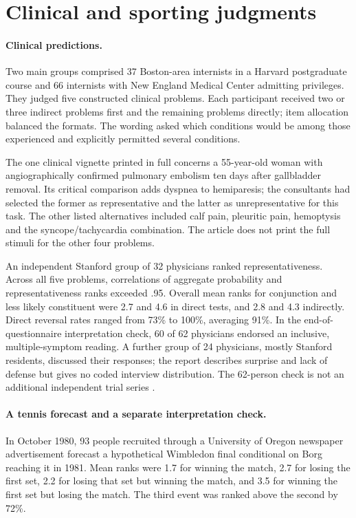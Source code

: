 \section{Clinical and sporting judgments}
\label{sec:p19-conjunction-expert-sport}

\paragraph{Clinical predictions.}
Two main groups comprised 37 Boston-area internists in a Harvard
postgraduate course and 66 internists with New England Medical Center
admitting privileges. They judged five constructed clinical problems.
Each participant received two or three indirect problems first and
the remaining problems directly; item allocation balanced the formats.
The wording asked which conditions would be among those experienced
and explicitly permitted several conditions.

The one clinical vignette printed in full concerns a 55-year-old woman
with angiographically confirmed pulmonary embolism ten days after
gallbladder removal. Its critical comparison
adds dyspnea to hemiparesis; the consultants had selected the former
as representative and the latter as unrepresentative for this task.
The other listed alternatives included calf pain, pleuritic pain,
hemoptysis and the syncope/tachycardia combination. The article does
not print the full stimuli for the other four problems.

An independent Stanford group of 32 physicians ranked representativeness.
Across all five problems, correlations of aggregate probability and
representativeness ranks exceeded .95. Overall mean ranks for conjunction
and less likely constituent were 2.7 and 4.6 in direct tests, and
2.8 and 4.3 indirectly. Direct reversal rates ranged from 73\% to 100\%,
averaging 91\%.
In the end-of-questionnaire interpretation check, 60 of 62 physicians
endorsed an inclusive, multiple-symptom reading. A further group of
24 physicians, mostly Stanford residents, discussed their responses;
the report describes surprise and lack of defense but gives no coded
interview distribution. The 62-person check is not an additional
independent trial series \cite[pp.~301--302]{TverskyKahneman1983Conjunction}.

\paragraph{A tennis forecast and a separate interpretation check.}
In October 1980, 93 people recruited through a University of Oregon
newspaper advertisement forecast a hypothetical Wimbledon final
conditional on Borg reaching it in 1981. Mean ranks were 1.7 for
winning the match, 2.7 for losing the first set, 2.2 for losing that
set but winning the match, and 3.5 for winning the first set but
losing the match. The third event was ranked above the second by 72\%.


